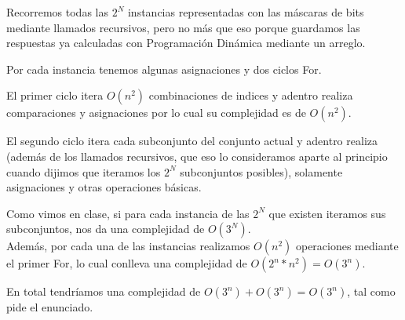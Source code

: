 Recorremos todas las $2^N$ instancias representadas con las máscaras de bits
mediante llamados recursivos, pero no más que eso porque guardamos las
respuestas ya calculadas con Programación Dinámica mediante un arreglo.

Por cada instancia tenemos algunas asignaciones y dos ciclos For.

El primer ciclo itera $O(n^2)$ combinaciones de indices y adentro realiza
comparaciones y asignaciones por lo cual su complejidad es de $O(n^2)$.

El segundo ciclo itera cada subconjunto del conjunto actual y adentro realiza
(además de los llamados recursivos, que eso lo consideramos aparte al principio
cuando dijimos que iteramos los $2^N$ subconjuntos posibles), solamente
asignaciones y otras operaciones básicas.

Como vimos en clase, si para cada instancia de las $2^N$ que existen iteramos
sus subconjuntos, nos da una complejidad de $O(3^N)$.\\ Además, por cada una de
las instancias realizamos $O(n^2)$ operaciones mediante el primer For, lo cual
conlleva una complejidad de $O(2^n * n^2) = O(3^n)$.

En total tendríamos una complejidad de $O(3^n) + O(3^n) = O(3^n)$, tal como pide
el enunciado.

